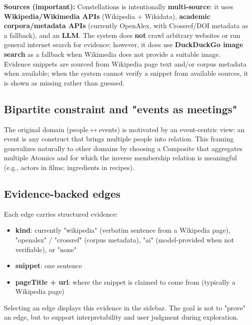 \textbf{Sources (important):} Constellations is intentionally \textbf{multi-source}: it uses \textbf{Wikipedia/Wikimedia APIs} (Wikipedia + Wikidata), \textbf{academic corpora/metadata APIs} (currently OpenAlex, with Crossref/DOI metadata as a fallback), and an \textbf{LLM}. The system does \textbf{not} crawl arbitrary websites or run general internet search for evidence; however, it does use \textbf{DuckDuckGo image search} as a fallback when Wikimedia does not provide a suitable image. Evidence snippets are sourced from Wikipedia page text and/or corpus metadata when available; when the system cannot verify a snippet from available sources, it is shown as missing rather than guessed.

\subsection{Bipartite constraint and "events as meetings"}

The original domain (people\(\leftrightarrow\)events) is motivated by an event-centric view: an event is any construct that brings multiple people into relation. This framing generalizes naturally to other domains by choosing a Composite that aggregates multiple Atomics and for which the inverse membership relation is meaningful (e.g., actors in films; ingredients in recipes).

\subsection{Evidence-backed edges}

Each edge carries structured evidence:

\begin{itemize}[leftmargin=*]

\item \textbf{kind}: currently "wikipedia" (verbatim sentence from a Wikipedia page), "openalex" / "crossref" (corpus metadata), "ai" (model-provided when not verifiable), or "none"

\item \textbf{snippet}: one sentence

\item \textbf{pageTitle + url}: where the snippet is claimed to come from (typically a Wikipedia page)

\end{itemize}

Selecting an edge displays this evidence in the sidebar. The goal is not to "prove" an edge, but to support interpretability and user judgment during exploration.

